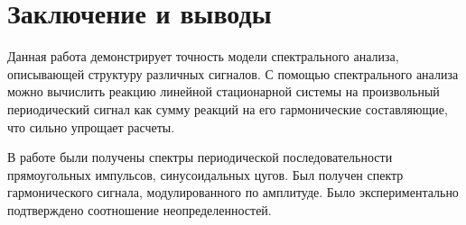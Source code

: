 \section*{Заключение и выводы}

Данная работа демонстрирует точность модели спектрального анализа, описывающей структуру различных сигналов. С помощью спектрального анализа можно вычислить реакцию линейной стационарной системы на произвольный периодический сигнал как сумму реакций на его гармонические составляющие, что сильно упрощает расчеты.

В работе были получены спектры периодической последовательности прямоугольных импульсов, синусоидальных цугов. Был получен спектр гармонического сигнала, модулированного по амплитуде. Было экспериментально подтверждено соотношение неопределенностей.